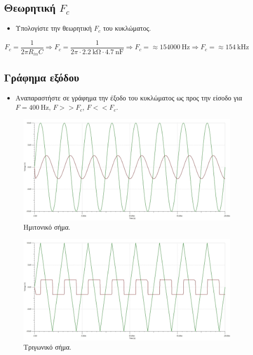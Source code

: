 \documentclass[12pt]{article}
\begin{document}
\subsection{Θεωρητική $F_c$}

\begin{itemize}
	\item Υπολογίστε την θεωρητική $F_c$ του κυκλώματος.
\end{itemize}

\[F_c = \frac{1}{2 \pi R_{in} C} \Rightarrow
F_c = \frac{1}{2 \pi \cdot \SI{2.2}{\kohm} \cdot \SI{4.7}{\nano\farad}} \Rightarrow
F_c = \approx \SI{154000}{\hertz} \Rightarrow
F_c = \approx \SI{154}{\kilo\hertz}\]

\subsection{Γράφημα εξόδου}

\begin{itemize}
	\item Αναπαραστήστε σε γράφημα την έξοδο του κυκλώματος ως προς την
		είσοδο για $F = \SI{400}{\hertz}$, $F >> F_c$, $F << F_c$.
\end{itemize}

\begin{figure}[H]
	\centering
	\includegraphics[width=\linewidth]{./res/sine.jpg}
	\caption{Ημιτονικό σήμα.}
\end{figure}

\begin{figure}[H]
	\centering
	\includegraphics[width=\linewidth]{./res/triang.jpg}
	\caption{Τριγωνικό σήμα.}
\end{figure}
\end{document}
